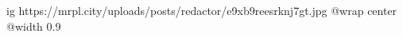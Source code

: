  
 
 
 
 

\ifcmt
  ig https://mrpl.city/uploads/posts/redactor/e9xb9reesrknj7gt.jpg
  @wrap center
  @width 0.9
\fi
